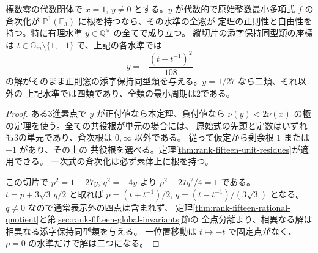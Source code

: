 \begin{corollary}\label{cor:rank-fifteen-vertical-one-rational}
標数零の代数閉体で $x=1$, $y\ne0$ とする。$y$ が代数的で原始整数最小多項式
$f$ の斉次化が $\mathbb P^1(\mathbb F_3)$ に根を持つなら、その水準の全窓が
定理の正則性と自由性を持つ。特に有理水準 $y\in\mathbb Q^\times$ の全てで成り立つ。
縦切片の添字保持同型類の座標は $t\in\mathbb G_m\setminus\{1,-1\}$ で、上記の各水準では
\[
                    y=-\frac{(t-t^{-1})^2}{108}
\]
の解がそのまま正則窓の添字保持同型類を与える。$y=1/27$ なら二類、それ以外の
上記水準では四類であり、全類の最小周期は2である。
\end{corollary}
\begin{proof}
ある3進素点で $y$ が正付値なら本定理、負付値なら
$\nu(y)<2\nu(x)$ の極の定理を使う。全ての共役根が単元の場合には、
原始式の先頭と定数はいずれも3の単元であり、斉次根は $0,\infty$ 以外である。
従って仮定から剰余根 $1$ または $-1$ があり、その上の
共役根を選べる。定理\ref{thm:rank-fifteen-unit-residues}が適用できる。
一次式の斉次化は必ず素体上に根を持つ。

この切片で $p^2=1-27y$, $q^2=-4y$ より $p^2-27q^2/4=1$ である。
$t=p+3\sqrt3\,q/2$ と取れば $p=(t+t^{-1})/2$,
$q=(t-t^{-1})/(3\sqrt3)$ となる。$q\ne0$ なので通常表示外の四点は含まれず、
定理\ref{thm:rank-fifteen-rational-quotient}と第\ref{sec:rank-fifteen-global-invariants}節の
全点分離より、相異なる解は相異なる添字保持同型類を与える。
一位置移動は $t\mapsto-t$ で固定点がなく、$p=0$ の水準だけで解は二つになる。
\end{proof}
